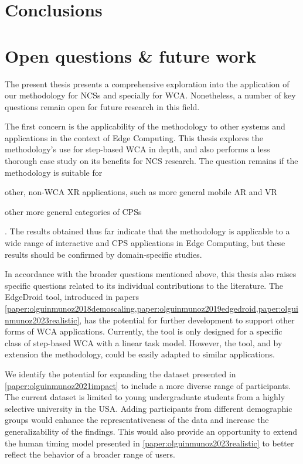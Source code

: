 \section{Conclusions}

\section{Open questions \& future work}

The present thesis presents a comprehensive exploration into the application of our methodology for \glspl{NCS} and specially for \gls{WCA}.
Nonetheless, a number of key questions remain open for future research in this field.

The first concern is the applicability of the methodology to other systems and applications in the context of Edge Computing.
This thesis explores the methodology's use for step-based \gls{WCA} in depth, and also performs a less thorough case study on its benefits for \gls{NCS} research.
The question remains if the methodology is suitable for
\begin{inlineenum}
    \item other, non-\gls{WCA} \gls{XR} applications, such as more general mobile \gls{AR} and \gls{VR}
    \item other more general categories of \glspl{CPS}
\end{inlineenum}.
The results obtained thus far indicate that the methodology is applicable to a wide range of interactive and \gls{CPS} applications in Edge Computing, but these results should be confirmed by domain-specific studies.

In accordance with the broader questions mentioned above, this thesis also raises specific questions related to its individual contributions to the literature.
The EdgeDroid tool, introduced in papers \cref{paper:olguinmunoz2018demoscaling,paper:olguinmunoz2019edgedroid,paper:olguinmunoz2023realistic}, has the potential for further development to support other forms of \gls{WCA} applications.
Currently, the tool is only designed for a specific class of step-based \gls{WCA} with a linear task model.
However, the tool, and by extension the methodology, could be easily adapted to similar applications.

We identify the potential for expanding the dataset presented in \cref{paper:olguinmunoz2021impact} to include a more diverse range of participants.
The current dataset is limited to young undergraduate students from a highly selective university in the \gls{USA}.
Adding participants from different demographic groups would enhance the representativeness of the data and increase the generalizability of the findings.
This would also provide an opportunity to extend the human timing model presented in \cref{paper:olguinmunoz2023realistic} to better reflect the behavior of a broader range of users.

